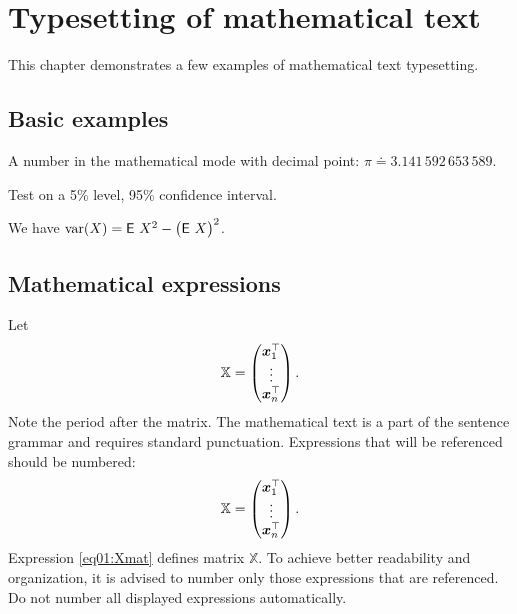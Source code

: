 %
%	 
%

\chapter{Typesetting of mathematical text}

This chapter demonstrates a few examples of mathematical text typesetting.

\section{Basic examples}


A number in the mathematical mode with decimal point: $\pi \doteq 3.141\,592\,653\,589$.

Test on a 5\% level, 95\% confidence interval.

We have $\operatorname{\textrm{var}}(X) = \operatorname{\textsf{E}\,} X^2 - \bigl(\operatorname{\textsf{E}\,} X \bigr)^2$.

\section{Mathematical expressions}
Let
\[
\mathbb{X} = \begin{pmatrix}
      \bm x_1^\top \\
      \vdots \\
      \bm x_n^\top
      \end{pmatrix}.
\]
Note the period after the matrix. The mathematical text is a part of
the sentence grammar and requires standard punctuation. Expressions
that will be referenced should be numbered:
\begin{equation}\label{eq01:Xmat}
\mathbb{X} = \begin{pmatrix}
      \bm x_1^\top \\
      \vdots \\
      \bm x_n^\top
      \end{pmatrix}.
\end{equation}
Expression \eqref{eq01:Xmat} defines matrix $\mathbb{X}$. To achieve
better readability and organization, it is advised to number only those
expressions that are referenced. Do not number all displayed
expressions automatically.


